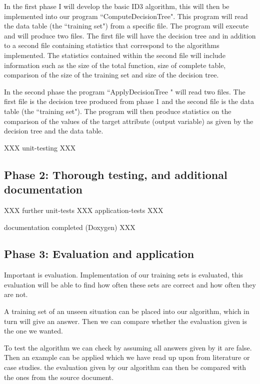 \documentclass{article}
\begin{document}
In the first phase I will develop the basic ID3 algorithm, this will then be implemented into our program ``ComputeDecisionTree". This program will read the data table (the ``training set") from a specific file. The program will execute and will produce two files. The first file will have the decision tree and in addition to a second file containing statistics that correspond to the algorithms implemented. The statistics contained within the second file will 
include information such as the size of the total function, size of complete table, comparison of the size of the training set and size of the decision tree.

In the second phase the program ``ApplyDecisionTree " will read two files. The first file is the decision tree produced from phase 1 and the second file is the data table (the ``training set"). The program will then produce statistics on the comparison of the values of the target attribute (output variable) as given by the decision tree and the data table.

XXX unit-testing XXX


\subsection{Phase 2: Thorough testing, and additional documentation}
\label{sec:phase2}

XXX further unit-tests XXX application-tests XXX

documentation completed (Doxygen) XXX


\subsection{Phase 3: Evaluation and application}
\label{sec:phase3}

Important is evaluation. Implementation of our training sets is evaluated, this evaluation will be able to find how often these sets are correct and how often they are not.

A training set of an unseen situation can be placed into our algorithm, which in turn will give an answer. Then we can compare whether the evaluation given is the one we wanted.

To test the algorithm we can check by assuming all answers given by it are false. Then an example can be applied which we have read up upon from literature or case studies. the evaluation given by our algorithm can then be compared with the ones from the source document.
\end{document}
